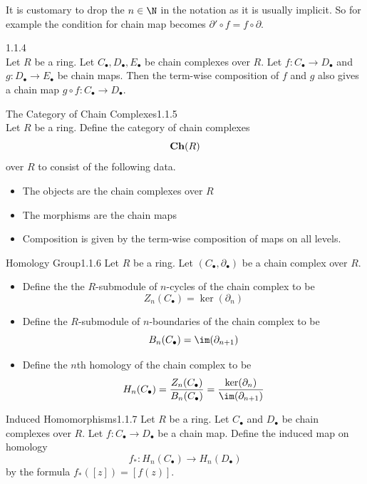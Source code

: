 \documentclass[a4paper]{article}
\begin{document}
It is customary to drop the $n\in\N$ in the notation as it is usually implicit. So for example the condition for chain map becomes $\partial'\circ f=f\circ\partial$. 

\begin{lmm}{}{1.1.4}\\
Let $R$ be a ring. Let $C_\bullet,D_\bullet,E_\bullet$ be chain complexes over $R$. Let $f:C_\bullet\to D_\bullet$ and $g:D_\bullet\to E_\bullet$ be chain maps. Then the term-wise composition of $f$ and $g$ also gives a chain map $g\circ f:C_\bullet\to D_\bullet$. 
\end{lmm}

\begin{defn}{The Category of Chain Complexes}{1.1.5}\\
Let $R$ be a ring. Define the category of chain complexes $$\bold{Ch}(R)$$ over $R$ to consist of the following data. 
\begin{itemize}
\item The objects are the chain complexes over $R$
\item The morphisms are the chain maps
\item Composition is given by the term-wise composition of maps on all levels. 
\end{itemize}
\end{defn}

\begin{defn}{Homology Group}{1.1.6} Let $R$ be a ring. Let $(C_\bullet,\partial_\bullet)$ be a chain complex over $R$. 
\begin{itemize}
\item Define the the $R$-submodule of $n$-cycles of the chain complex to be $$Z_n(C_\bullet)=\ker(\partial_n)$$
\item Define the $R$-submodule of $n$-boundaries of the chain complex to be $$B_n(C_\bullet)=\im(\partial_{n+1})$$
\item Define the $n$th homology of the chain complex to be $$H_n(C_\bullet)=\frac{Z_n(C_\bullet)}{B_n(C_\bullet)}=\frac{\ker(\partial_n)}{\im(\partial_{n+1})}$$
\end{itemize}
\end{defn}

\begin{defn}{Induced Homomorphisms}{1.1.7} Let $R$ be a ring. Let $C_\bullet$ and $D_\bullet$ be chain complexes over $R$. Let $f:C_\bullet\to D_\bullet$ be a chain map. Define the induced map on homology $$f_\ast:H_n(C_\bullet)\to H_n(D_\bullet)$$ by the formula $f_\ast([z])=[f(z)]$. 
\end{defn}
\end{document}
